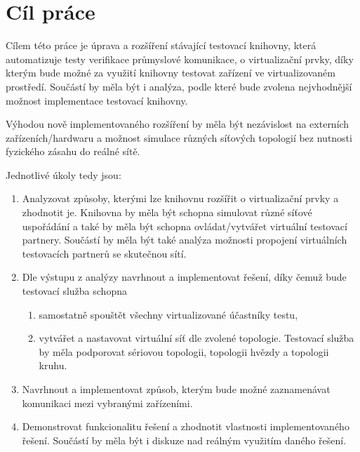 \chapter{Cíl práce}\label{chap:cil}

Cílem této práce je úprava a rozšíření stávající testovací knihovny, která automatizuje testy verifikace průmyslové komunikace, o virtualizační prvky, díky kterým bude možné za využití knihovny testovat zařízení ve virtualizovaném prostředí. Součástí by měla být i analýza, podle které bude zvolena nejvhodnější možnost implementace testovací knihovny.

Výhodou nově implementovaného rozšíření by měla být nezávislost na externích zařízeních/hardwaru a možnost simulace různých síťových topologií bez nutnosti fyzického zásahu do reálné sítě.

Jednotlivé úkoly tedy jsou:
\begin{enumerate}
    \item Analyzovat způsoby, kterými lze knihovnu rozšířit o virtualizační prvky a zhodnotit je. Knihovna by měla být schopna simulovat různé síťové uspořádání a také by měla být schopna ovládat/vytvářet virtuální testovací partnery. Součástí by měla být také analýza možnosti propojení virtuálních testovacích partnerů se skutečnou sítí.
    \item Dle výstupu z analýzy navrhnout a implementovat řešení, díky čemuž bude testovací služba schopna
          \begin{enumerate}
              \item samostatně spouštět všechny virtualizované účastníky testu,
              \item vytvářet a nastavovat virtuální síť dle zvolené topologie. Testovací služba by měla podporovat sériovou topologii, topologii hvězdy a topologii kruhu.
          \end{enumerate}
    \item Navrhnout a implementovat způsob, kterým bude možné zaznamenávat komunikaci mezi vybranými zařízeními.
    \item Demonstrovat funkcionalitu řešení a zhodnotit vlastnosti implementovaného řešení. Součástí by měla být i diskuze nad reálným využitím daného řešení.
\end{enumerate}